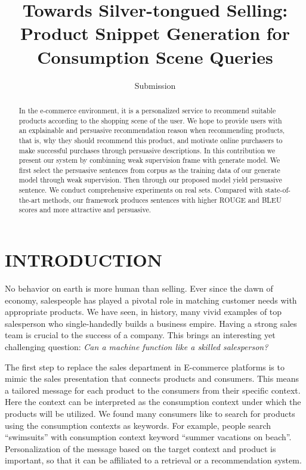 \documentclass[sigconf]{acmart}
\begin{document}
\title{Towards Silver-tongued Selling: Product Snippet Generation for Consumption Scene Queries}

\author{Submission }


\begin{abstract}
In the e-commerce environment, it is a personalized service to recommend suitable products according to the shopping scene of the user. We hope to provide users with an explainable and persuasive recommendation reason when recommending products, that is, why they should recommend this product, and motivate online purchasers to make successful purchases through persuasive descriptions. In this contribution we present our system by combinning weak supervision frame with generate model.  We first select the persuasive sentences from corpus as the training data of our generate model through weak supervision. Then through our proposed model yield persuasive sentence. We conduct comprehensive experiments on real sets. Compared with state-of-the-art methods, our framework produces sentences with higher ROUGE and BLEU scores and more attractive and persuasive.

\end{abstract}



\maketitle

\section{INTRODUCTION}
No behavior on earth is more human than selling.
Ever since the dawn of economy, salespeople has played a pivotal role in matching customer needs with appropriate products. 
We have seen, in history, many vivid examples of top salesperson who single-handedly builds a business empire.
Having a strong sales team is crucial to the success of a company. 
This brings an interesting yet challenging question: \textit{ Can a machine function like a skilled salesperson?} 

The first step to replace the sales department in E-commerce platforms is to mimic the sales presentation that connects products and consumers.
This means a tailored message for each product to the consumers from their specific context. 
Here the context can be interpreted as the consumption context under which the products will be utilized. 
We found many consumers like to search for products using the consumption contexts as keywords. For example, people search ``swimsuits'' with consumption context keyword ``summer vacations on beach''. 
Personalization of the message based on the target context and product is important, so that it can be affiliated to a retrieval or a recommendation system.
\end{document}
